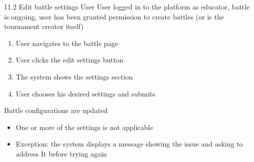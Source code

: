 {11.2}
{Edit battle settings} %
{User} %
{User logged in to the platform as educator, battle is ongoing, user has been granted permission to create battles (or is the tournament creator itself)} %
{ %
    \begin{enumerate}
        \item User navigates to the battle page
        \item User clicks the edit settings button
        \item The system shows the settings section
        \item User chooses his desired settings and submits
    \end{enumerate}
}
{Battle configurations are updated} %
{ %
    \begin{itemize}
        \item One or more of the settings is not applicable
    \end{itemize}
}
{ %
    \begin{itemize}
        \item Exception: the system displays a message showing the issue and asking to address It before trying again
    \end{itemize}
}


